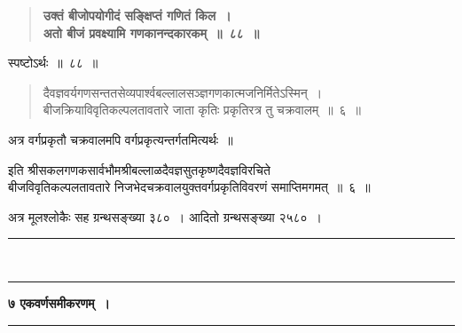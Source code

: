 \documentclass[11pt, openany]{book}
\begin{document}
\begin{sloppypar}

 \label{6.88}
\begin{quote}
{\large \textbf{{\color{purple}उक्तं बीजोपयोगीदं सङ्क्षिप्तं गणितं किल~।\\
अतो बीजं प्रवक्ष्यामि गणकानन्दकारकम्~॥~८८~॥}}}
\end{quote}

स्पष्टोऽर्थः~॥~८८~॥
\vspace{2mm}

\begin{quote}
{\color{violet}दैवज्ञवर्यगणसन्ततसेव्यपार्श्वबल्लालसञ्ज्ञगणकात्मजनिर्मितेऽस्मिन्~।\\
बीजक्रियाविवृतिकल्पलतावतारे जाता कृतिः प्रकृतिरत्र तु चक्रवालम्~॥~६~॥}
\end{quote}

अत्र वर्गप्रकृतौ चक्रवालमपि वर्गप्रकृत्यन्तर्गतमित्यर्थः~॥

\begin{center}
इति श्रीसकलगणकसार्वभौमश्रीबल्लाळदैवज्ञसुतकृष्णदैवज्ञविरचिते \\
बीजविवृतिकल्पलतावतारे निजभेदचक्रवालयुक्तवर्गप्रकृतिविवरणं समाप्तिमगमत्~॥~६~॥\\
\vspace{1mm}

अत्र मूलश्लोकैः सह ग्रन्थसङ्ख्या ३८०~। आदितो ग्रन्थसङ्ख्या २५८०~।
\vspace{6mm}

\rule{0.2\linewidth}{0.8pt}\\
\vspace{-4mm}

\rule{0.2\linewidth}{0.8pt}

\end{center}
\end{sloppypar}

\newpage
\thispagestyle{empty}

\begin{center}
\textbf{\large ७\; एकवर्णसमीकरणम्~।}\\
\rule{0.2\linewidth}{0.8pt}
\end{center}
\end{document}

